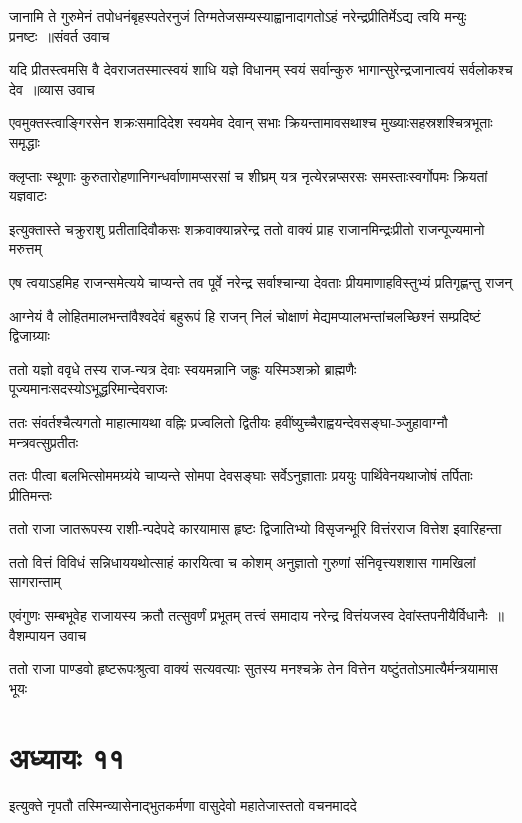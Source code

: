 \twolineshloka
{जानामि ते गुरुमेनं तपोधनंबृहस्पतेरनुजं तिग्मतेजसम्यस्याह्वानादागतोऽहं नरेन्द्रप्रीतिर्मेऽद्य त्वयि मन्युः प्रनष्टः ॥संवर्त उवाच}
{}


\threelineshloka
{यदि प्रीतस्त्वमसि वै देवराजतस्मात्स्वयं शाधि यज्ञे विधानम्}
{स्वयं सर्वान्कुरु भागान्सुरेन्द्रजानात्वयं सर्वलोकश्च देव ॥व्यास उवाच}
{}


\twolineshloka
{एवमुक्तस्त्वाङ्गिरसेन शक्रःसमादिदेश स्वयमेव देवान्}
{सभाः क्रियन्तामावसथाश्च मुख्याःसहस्रशश्चित्रभूताः समृद्धाः}


\twolineshloka
{क्लृप्ताः स्थूणाः कुरुतारोहणानिगन्धर्वाणामप्सरसां च शीघ्रम्}
{यत्र नृत्येरन्नप्सरसः समस्ताःस्वर्गोपमः क्रियतां यज्ञवाटः}


\twolineshloka
{इत्युक्तास्ते चक्रुराशु प्रतीतादिवौकसः शक्रवाक्यान्नरेन्द्र}
{ततो वाक्यं प्राह राजानमिन्द्रःप्रीतो राजन्पूज्यमानो मरुत्तम्}


\twolineshloka
{एष त्वयाऽहमिह राजन्समेत्यये चाप्यन्ते तव पूर्वे नरेन्द्र}
{सर्वाश्चान्या देवताः प्रीयमाणाहविस्तुभ्यं प्रतिगृह्णन्तु राजन्}


\twolineshloka
{आग्नेयं वै लोहितमालभन्तांवैश्वदेवं बहुरूपं हि राजन्}
{निलं चोक्षाणं मेद्यमप्यालभन्तांचलच्छिश्नं सम्प्रदिष्टं द्विजाग्र्याः}


\twolineshloka
{ततो यज्ञो ववृधे तस्य राज-न्यत्र देवाः स्वयमन्नानि जह्रुः}
{यस्मिञ्शक्रो ब्राह्मणैः पूज्यमानःसदस्योऽभूद्धरिमान्देवराजः}


\twolineshloka
{ततः संवर्तश्चैत्यगतो माहात्मायथा वह्निः प्रज्वलितो द्वितीयः}
{हवींष्युच्चैराह्वयन्देवसङ्घा-ञ्जुहावाग्नौ मन्त्रवत्सुप्रतीतः}


\twolineshloka
{ततः पीत्वा बलभित्सोममग्र्यंये चाप्यन्ते सोमपा देवसङ्घाः}
{सर्वेऽनुज्ञाताः प्रययुः पार्थिवेनयथाजोषं तर्पिताः प्रीतिमन्तः}


\twolineshloka
{ततो राजा जातरूपस्य राशी-न्पदेपदे कारयामास हृष्टः}
{द्विजातिभ्यो विसृजन्भूरि वित्तंरराज वित्तेश इवारिहन्ता}


\twolineshloka
{ततो वित्तं विविधं सन्निधाययथोत्साहं कारयित्वा च कोशम्}
{अनुज्ञातो गुरुणां संनिवृत्त्यशशास गामखिलां सागरान्ताम्}


\threelineshloka
{एवंगुणः सम्बभूवेह राजायस्य क्रतौ तत्सुवर्णं प्रभूतम्}
{तत्त्वं समादाय नरेन्द्र वित्तंयजस्व देवांस्तपनीयैर्विधानैः ॥वैशम्पायन उवाच}
{}


\twolineshloka
{ततो राजा पाण्डवो हृष्टरूपःश्रुत्वा वाक्यं सत्यवत्याः सुतस्य}
{मनश्चक्रे तेन वित्तेन यष्टुंततोऽमात्यैर्मन्त्रयामास भूयः}


\chapter{अध्यायः ११}
\twolineshloka
{इत्युक्ते नृपतौ तस्मिन्व्यासेनाद्भुतकर्मणा}
{वासुदेवो महातेजास्ततो वचनमाददे}


